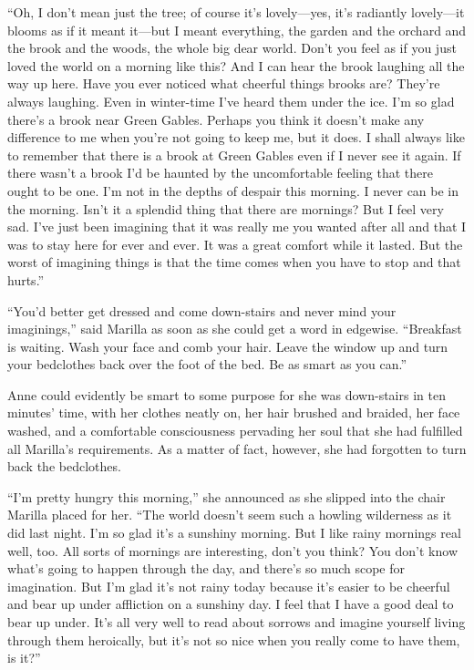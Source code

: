 \documentclass[a4paper]{article}
\begin{document}
``Oh, I don't mean just the tree; of course it's lovely---yes, it's radiantly lovely---it blooms as if it meant it---but I meant everything, the garden and the orchard and the brook and the woods, the whole big dear world. Don't you feel as if you just loved the world on a morning like this? And I can hear the brook laughing all the way up here. Have you ever noticed what cheerful things brooks are? They're always laughing. Even in winter-time I've heard them under the ice. I'm so glad there's a brook near Green Gables. Perhaps you think it doesn't make any difference to me when you're not going to keep me, but it does. I shall always like to remember that there is a brook at Green Gables even if I never see it again. If there wasn't a brook I'd be haunted by the uncomfortable feeling that there ought to be one. I'm not in the depths of despair this morning. I never can be in the morning. Isn't it a splendid thing that there are mornings? But I feel very sad. I've just been imagining that it was really me you wanted after all and that I was to stay here for ever and ever. It was a great comfort while it lasted. But the worst of imagining things is that the time comes when you have to stop and that hurts.''

\ttfamily ``You'd better get dressed and come down-stairs and never mind your imaginings,'' said Marilla as soon as she could get a word in edgewise. ``Breakfast is waiting. Wash your face and comb your hair. Leave the window up and turn your bedclothes back over the foot of the bed. Be as smart as you can.''

Anne could evidently be smart to some purpose for she was down-stairs in ten minutes' time, with her clothes neatly on, her hair brushed and braided, her face washed, and a comfortable consciousness pervading her soul that she had fulfilled all Marilla's requirements. As a matter of fact, however, she had forgotten to turn back the bedclothes.

``I'm pretty hungry this morning,'' she announced as she slipped into the chair Marilla placed for her. ``The world doesn't seem such a howling wilderness as it did last night. I'm so glad it's a sunshiny morning. But I like rainy mornings real well, too. All sorts of mornings are interesting, don't you think? You don't know what's going to happen through the day, and there's so much scope for imagination. But I'm glad it's not rainy today because it's easier to be cheerful and bear up under affliction on a sunshiny day. I feel that I have a good deal to bear up under. It's all very well to read about sorrows and imagine yourself living through them heroically, but it's not so nice when you really come to have them, is it?''
\end{document}
